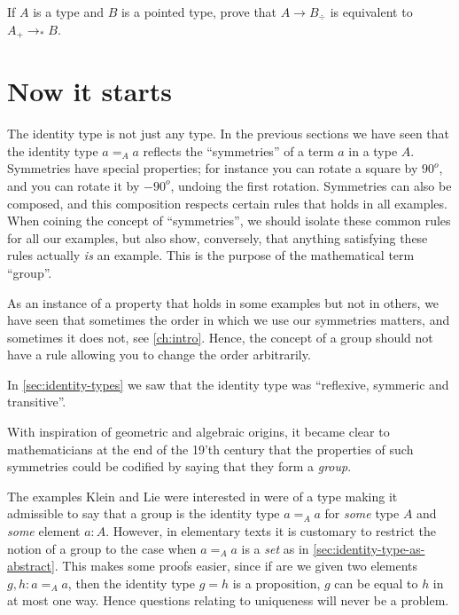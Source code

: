 \begin{definition}
\begin{xca}
  If $A$ is a type and $B$ is a pointed type, prove that $A\to B_\div$ is equivalent to $A_+\to_*B$.
\end{xca}



\section{Now it starts}
The identity type is not just any type.  In the previous sections we have seen that the identity type $a=_Aa$ reflects the ``symmetries'' of a term $a$ in a type $A$.  Symmetries have special properties; for instance you can rotate a square by $90^o$, and you can rotate it by $-90^o$, undoing the first rotation.
Symmetries can also be composed, and this composition respects certain rules that holds in all examples.  When coining the concept of ``symmetries'', we should isolate these common rules for all our examples, but also show, conversely, that anything satisfying these rules actually \emph{is} an example.  This is the purpose of the mathematical term ``group''.

As an instance of a property that holds in some examples but not in others, we have seen that sometimes the order in which we use our symmetries matters, and sometimes it does not, see \cref{ch:intro}.  Hence, the concept of a group should not have a rule allowing you to change the order arbitrarily.

In \cref{sec:identity-types} we saw that the identity type was ``reflexive, symmeric and transitive''.


With inspiration of geometric and algebraic origins, it became clear to mathematicians at the end of the 19'th century that the properties of such symmetries could be codified by saying that they form a \emph{group}.

The examples Klein and Lie were interested in were of a type making it admissible to say that a group is the identity type $a=_Aa$ for \emph{some} type $A$ and \emph{some} element $a:A$.
However, in elementary texts it is customary to restrict the notion of a group to the case when $a=_Aa$ is a \emph{set} as in \cref{sec:identity-type-as-abstract}.  This makes some proofs easier, since if are we given two elements $g,h:a=_Aa$, then the identity type $g=h$ is a proposition, \ie $g$ can be equal to $h$ in at most one way.  Hence questions relating to uniqueness will never be a problem.




\end{definition}
